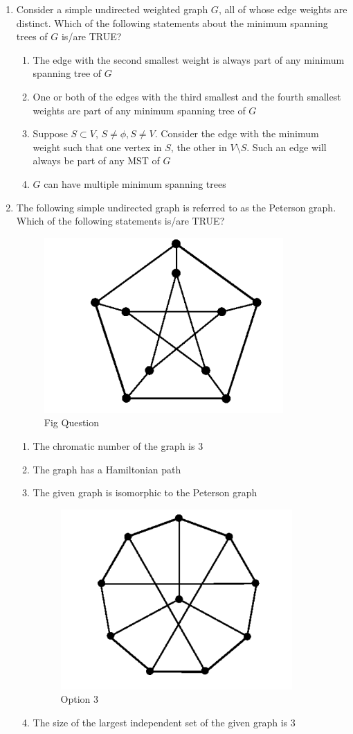 \begin{enumerate}
\hfill{}

\item Consider a simple undirected weighted graph $G$, all of whose edge weights are distinct. Which of the following statements about the minimum spanning trees of $G$ is/are TRUE?  

\begin{enumerate}
\item The edge with the second smallest weight is always part of any minimum spanning tree of $G$
\item One or both of the edges with the third smallest and the fourth smallest weights are part of any minimum spanning tree of $G$
\item Suppose $S\subset V$, $S \neq \phi, S \neq V$. Consider the edge with the minimum weight such that one vertex in $S$, the other in $V\setminus S$. Such an edge will always be part of any MST of $G$
\item $G$ can have multiple minimum spanning trees
\end{enumerate}

\hfill{}

\item The following simple undirected graph is referred to as the Peterson graph. Which of the following statements is/are TRUE?  
\begin{figure}[H]
\centering
\includegraphics[width=0.2\columnwidth]{figs/q50.png}
\caption{Fig Question}
\label{fig:q50}
\end{figure}
\begin{enumerate}
\item The chromatic number of the graph is 3
\item The graph has a Hamiltonian path
\item The given graph is isomorphic to the Peterson graph
\begin{figure}[H]
\centering
\includegraphics[width=0.2\columnwidth]{figs/q50-1.png}
\caption{Option 3}
\label{fig:q50}
\end{figure}
\item The size of the largest independent set of the given graph is 3
\end{enumerate}


\end{enumerate}
